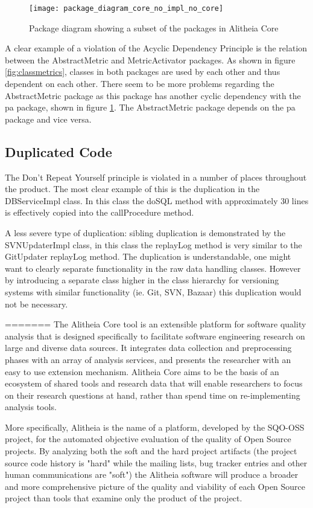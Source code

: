 \documentclass[a4paper,11pt,titlepage]{article}
\begin{document}
\begin{figure}
\texttt{[image: package\_diagram\_core\_no\_impl\_no\_core]}
\centering
\caption{Package diagram showing a subset of the packages in Alitheia Core}
\label{fig:package}
\end{figure}

A clear example of a violation of the Acyclic Dependency Principle is the relation between the AbstractMetric and MetricActivator packages. As shown in figure \ref{fig:classmetrics}, classes in both packages are used by each other and thus dependent on each other. There seem to be more problems regarding the AbstractMetric package as this package has another cyclic dependency with the pa package, shown in figure \ref{fig:package}. The AbstractMetric package depends on the pa package and vice versa.

\subsection{Duplicated Code}
The Don't Repeat Yourself principle is violated in a number of places throughout the product. The most clear example of this is the duplication in the DBServiceImpl class. In this class the doSQL method with approximately 30 lines is effectively copied into the callProcedure method.

A less severe type of duplication: sibling duplication is demonstrated by the SVNUpdaterImpl class, in this class the replayLog method is very similar to the GitUpdater replayLog method. The duplication is understandable, one might want to clearly separate functionality in the raw data handling classes. However by introducing a separate class higher in the class hierarchy for versioning systems with similar functionality (ie. Git, SVN, Bazaar) this duplication would not be necessary.


=======
The Alitheia Core tool is an extensible platform for software quality analysis that is designed specifically to facilitate software engineering research on large and diverse data sources. It integrates data collection and preprocessing phases with an array of analysis services, and presents the researcher with an easy to use extension mechanism. Alitheia Core aims to be the basis of an ecosystem of shared tools and research data that will enable researchers to focus on their research questions at hand, rather than spend time on re-implementing analysis tools.

More specifically, Alitheia is the name of a platform, developed by the SQO-OSS project, for the automated objective evaluation of the quality of Open Source projects. By analyzing both the soft and the hard project artifacts (the project source code history is "hard" while the mailing lists, bug tracker entries and other human communications are "soft") the Alitheia software will produce a broader and more comprehensive picture of the quality and viability of each Open Source project than tools that examine only the product of the project.
\end{document}

